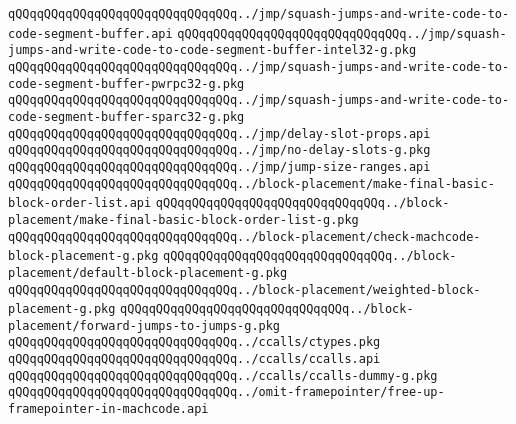 \verb|qQQqqQQqqQQqqQQqqQQqqQQqqQQqqQQq../jmp/squash-jumps-and-write-code-to-code-segment-buffer.api|\newline
\verb|qQQqqQQqqQQqqQQqqQQqqQQqqQQqqQQq../jmp/squash-jumps-and-write-code-to-code-segment-buffer-intel32-g.pkg|\newline
\verb|qQQqqQQqqQQqqQQqqQQqqQQqqQQqqQQq../jmp/squash-jumps-and-write-code-to-code-segment-buffer-pwrpc32-g.pkg|\newline
\verb|qQQqqQQqqQQqqQQqqQQqqQQqqQQqqQQq../jmp/squash-jumps-and-write-code-to-code-segment-buffer-sparc32-g.pkg|\newline
\verb|qQQqqQQqqQQqqQQqqQQqqQQqqQQqqQQq../jmp/delay-slot-props.api|\newline
\verb|qQQqqQQqqQQqqQQqqQQqqQQqqQQqqQQq../jmp/no-delay-slots-g.pkg|\newline
\verb|qQQqqQQqqQQqqQQqqQQqqQQqqQQqqQQq../jmp/jump-size-ranges.api|\newline
\verb|qQQqqQQqqQQqqQQqqQQqqQQqqQQqqQQq../block-placement/make-final-basic-block-order-list.api|\newline
\verb|qQQqqQQqqQQqqQQqqQQqqQQqqQQqqQQq../block-placement/make-final-basic-block-order-list-g.pkg|\newline
\verb|qQQqqQQqqQQqqQQqqQQqqQQqqQQqqQQq../block-placement/check-machcode-block-placement-g.pkg|\newline
\verb|qQQqqQQqqQQqqQQqqQQqqQQqqQQqqQQq../block-placement/default-block-placement-g.pkg|\newline
\verb|qQQqqQQqqQQqqQQqqQQqqQQqqQQqqQQq../block-placement/weighted-block-placement-g.pkg|\newline
\verb|qQQqqQQqqQQqqQQqqQQqqQQqqQQqqQQq../block-placement/forward-jumps-to-jumps-g.pkg|\newline
\verb|qQQqqQQqqQQqqQQqqQQqqQQqqQQqqQQq../ccalls/ctypes.pkg|\newline
\verb|qQQqqQQqqQQqqQQqqQQqqQQqqQQqqQQq../ccalls/ccalls.api|\newline
\verb|qQQqqQQqqQQqqQQqqQQqqQQqqQQqqQQq../ccalls/ccalls-dummy-g.pkg|\newline
\verb|qQQqqQQqqQQqqQQqqQQqqQQqqQQqqQQq../omit-framepointer/free-up-framepointer-in-machcode.api|\newline

